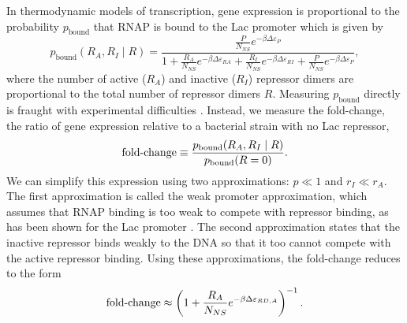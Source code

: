 In thermodynamic models of transcription, gene expression is proportional to the
probability $p_{\text{bound}}$ that RNAP is bound to the Lac promoter which is
given by
\begin{equation}\label{eq2}
p_{\text{bound}}(R_A, R_I \mid R)=\frac{\frac{P}{N_{NS}}e^{-\beta  \Delta\varepsilon_{P}}}{1+\frac{R_A}{N_{NS}}e^{-\beta \Delta\varepsilon_{RA}}+\frac{R_I}{N_{NS}}e^{-\beta  \Delta\varepsilon_{RI}}+\frac{P}{N_{NS}}e^{-\beta  \Delta\varepsilon_{P}}},
\end{equation}
where the number of active ($R_A$) and inactive ($R_I$) repressor dimers are proportional to the total number of repressor dimers $R$.
Measuring $p_{\text{bound}}$ directly is fraught with experimental difficulties \cite{Bintu2005}. Instead, we measure the fold-change, the ratio of gene expression relative to a bacterial strain with no Lac repressor,
\begin{equation}\label{eq3}
\foldchange\equiv \frac{p_{\text{bound}}(R_A, R_I \mid R)}{p_{\text{bound}}(R = 0)}.%
\end{equation}
We can simplify this expression using two approximations: \(p\ll 1\) and
\(r_I\ll r_A\). The first approximation is called the weak promoter
approximation, which assumes that RNAP binding is too weak to compete with
repressor binding, as has been shown for the Lac promoter \cite{Brewster2012}.
The second approximation states that the inactive repressor binds weakly to the
DNA so that it too cannot compete with the active repressor binding. Using these
approximations, the fold-change reduces to the form
\begin{equation}\label{eq4}
\operatorname{fold-change} \approx \left(1+\frac{R_A}{N_{NS}}e^{-\beta  \Delta\varepsilon_{RD,A}}\right)^{-1}.
\end{equation}

